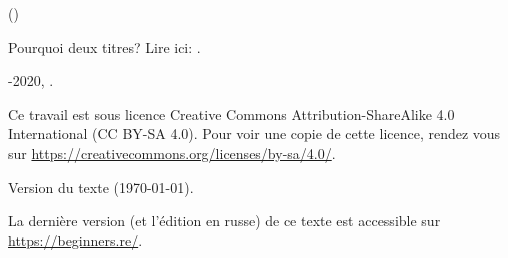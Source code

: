 ﻿\begin{titlepage}


\end{titlepage}

\newpage

\begin{center}
\vspace*{\fill}
{\LARGE \TitleMain}

\bigskip

{\large (\TitleAux)}

\bigskip
\bigskip
Pourquoi deux titres? Lire ici: .

\vspace*{\fill}

{\large \AUTHOR}

{\large \TT{\EMAILPRI}}
\vspace*{\fill}
\vfill

\ccbysa

-2020, \AUTHOR.

Ce travail est sous licence Creative Commons Attribution-ShareAlike 4.0 International (CC BY-SA 4.0).
Pour voir une copie de cette licence, rendez vous sur \url{https://creativecommons.org/licenses/by-sa/4.0/}.

Version du texte ({\large \today}).

La dernière version (et l'édition en russe) de ce texte est accessible sur \url{https://beginners.re/}. 

\end{center}
